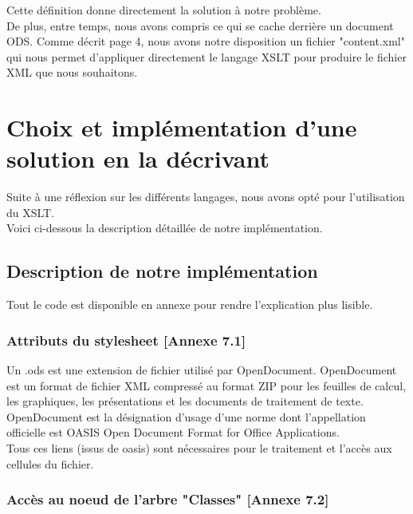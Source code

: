 \documentclass[11pt]{report}
\begin{document}
Cette définition donne directement la solution à notre problème.\\
De plus, entre temps, nous avons compris ce qui se cache derrière un document ODS. Comme décrit page 4, nous avons  notre disposition un fichier "content.xml" qui nous permet d'appliquer directement le langage XSLT pour produire le fichier XML que nous souhaitons.


\chapter{Choix et implémentation d'une solution en la décrivant}
Suite à une réflexion sur les différents langages, nous avons opté pour l'utilisation du XSLT.\\
Voici ci-dessous la description détaillée de notre implémentation.
 
\section{Description de notre implémentation}

Tout le code est disponible en annexe pour rendre l'explication plus lisible.

\subsection{Attributs du stylesheet [Annexe 7.1]} 
Un .ods est une extension de fichier utilisé par OpenDocument. OpenDocument est un format de fichier XML compressé au format ZIP pour les feuilles de calcul, les graphiques, les présentations et les documents de traitement de texte.\\ 
OpenDocument est la désignation d'usage d'une norme dont l'appellation officielle est OASIS Open Document Format for Office Applications.\\

Tous ces liens (issus de oasis) sont nécessaires pour le traitement et l'accès aux cellules du fichier.




\subsection{Accès au noeud de l'arbre "Classes" [Annexe 7.2]}
\end{document}
